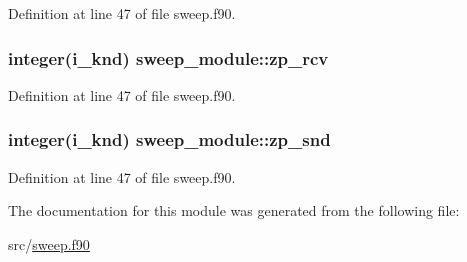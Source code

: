 Definition at line 47 of file sweep.\-f90.

\hypertarget{classsweep__module_a2e606e13d5d6df88605a757235d90f15}{
\subsubsection[{zp\-\_\-rcv}]{\setlength{\rightskip}{0pt plus 5cm}integer(i\-\_\-knd) sweep\-\_\-module\-::zp\-\_\-rcv\hspace{0.3cm}{\ttfamily [private]}}}\label{classsweep__module_a2e606e13d5d6df88605a757235d90f15}


Definition at line 47 of file sweep.\-f90.

\hypertarget{classsweep__module_a5d8635df65a44c026ab27c08910d91d8}{
\subsubsection[{zp\-\_\-snd}]{\setlength{\rightskip}{0pt plus 5cm}integer(i\-\_\-knd) sweep\-\_\-module\-::zp\-\_\-snd\hspace{0.3cm}{\ttfamily [private]}}}\label{classsweep__module_a5d8635df65a44c026ab27c08910d91d8}


Definition at line 47 of file sweep.\-f90.



The documentation for this module was generated from the following file\-:\begin{DoxyCompactItemize}
\item 
src/\hyperlink{sweep_8f90}{sweep.\-f90}\end{DoxyCompactItemize}
